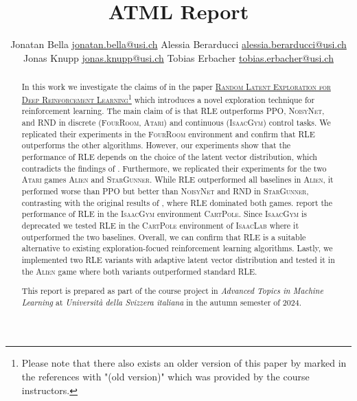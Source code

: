 \documentclass[10pt]{article} %
\title{ATML Report}
\author{%
  \name Jonatan Bella \email \href{mailto:jonatan.bella@usi.ch}{jonatan.bella@usi.ch}
  \AND
  \name Alessia Berarducci \email \href{mailto:alessia.berarducci@usi.ch}{alessia.berarducci@usi.ch}
  \AND
  \name Jonas Knupp \email \href{mailto:jonas.knupp@usi.ch}{jonas.knupp@usi.ch}
  \AND
  \name Tobias Erbacher \email \href{mailto:tobias.erbacher@usi.ch}{tobias.erbacher@usi.ch}
}
\begin{document}
\maketitle

\begin{abstract}
In this work we investigate the claims of \cite{rle-paper} in the paper \href{https://arxiv.org/abs/2407.13755}{\textsc{Random Latent Exploration for Deep Reinforcement Learning}}\footnote{Please note that there also exists an older version of this paper by \cite{rle-paper-old} marked in the references with "(old version)" which was provided by the course instructors.} which introduces a novel exploration technique for reinforcement learning. The main claim of \cite{rle-paper} is that \textsc{RLE} outperforms \textsc{PPO}, \textsc{NoisyNet}, and \textsc{RND} in discrete (\textsc{FourRoom}, \textsc{Atari}) and continuous (\textsc{IsaacGym}) control tasks. We replicated their experiments in the \textsc{FourRoom} environment and confirm that \textsc{RLE} outperforms the other algorithms. However, our experiments show that the performance of \textsc{RLE} depends on the choice of the latent vector distribution, which contradicts the findings of \cite{rle-paper}. Furthermore, we replicated their experiments for the two \textsc{Atari} games \textsc{Alien} and \textsc{StarGunner}. While \textsc{RLE} outperformed all baselines in \textsc{Alien}, it performed worse than \textsc{PPO} but better than \textsc{NoisyNet} and \textsc{RND} in \textsc{StarGunner}, contrasting with the original results of \cite{rle-paper}, where \textsc{RLE} dominated both games. \cite{rle-paper} report the performance of \textsc{RLE} in the \textsc{IsaacGym} environment \textsc{CartPole}. Since \textsc{IsaacGym} is deprecated we tested \textsc{RLE} in the \textsc{CartPole} environment of \textsc{IsaacLab} where it outperformed the two baselines. Overall, we can confirm that \textsc{RLE} is a suitable alternative to existing exploration-focued reinforcement learning algorithms. Lastly, we implemented two \textsc{RLE} variants with adaptive latent vector distribution and tested it in the \textsc{Alien} game where both variants outperformed standard \textsc{RLE}.


This report is prepared as part of the course project in \textit{Advanced Topics in Machine Learning} at \textit{Università della Svizzera italiana} in the autumn semester of $2024$. 
\end{abstract}

\vspace{-18pt}
\end{document}
